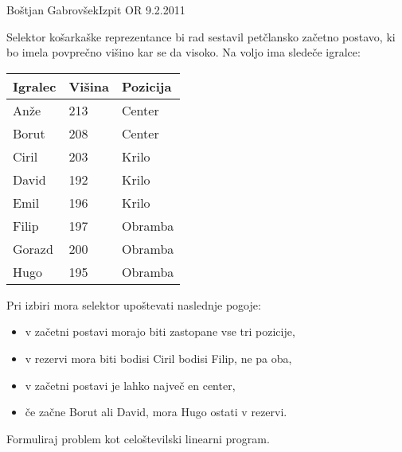 \begin{naloga}{Boštjan Gabrovšek}{Izpit OR 9.2.2011}
\begin{vprasanje}
Selektor košarkaške reprezentance bi rad sestavil petčlansko začetno postavo, ki bo imela povprečno
višino kar se da visoko. Na voljo ima sledeče igralce:
\begin{center}
\begin{tabular}{lll}
Igralec & Višina & Pozicija \\ \hline
Anže    & 213    & Center   \\
Borut   & 208    & Center   \\
Ciril   & 203    & Krilo    \\
David   & 192    & Krilo    \\
Emil    & 196    & Krilo    \\
Filip   & 197    & Obramba  \\
Gorazd  & 200    & Obramba  \\
Hugo    & 195    & Obramba  \\
\end{tabular}
\end{center}
Pri izbiri mora selektor upoštevati naslednje pogoje:
\begin{itemize}
\item v začetni postavi morajo biti zastopane vse tri pozicije,
\item v rezervi mora biti bodisi Ciril bodisi Filip, ne pa oba,
\item v začetni postavi je lahko največ en center,
\item če začne Borut ali David, mora Hugo ostati v rezervi.
\end{itemize}
Formuliraj problem kot celoštevilski linearni program.
\end{vprasanje}


\end{naloga}
